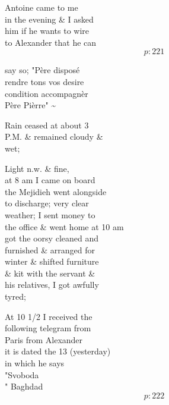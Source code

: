 \documentclass{report}
\begin{document}
	\par{
 	Antoine came to me\ \\in the evening \& I asked\ \\him if he wants to wire\ \\to Alexander that he can\ \\
  \[p: 221 \]

	}


	\par{
 	say so; "Père disposé\ \\rendre tons vos desire\ \\condition accompagnèr\ \\Père Pièrre" \~{}\ \\
	}

	\par{
 	Rain ceased at about 3\ \\P.M. \& remained cloudy \&\ \\wet;\ \\
	}

	\par{
 	Light n.w. \& fine,\ \\at 8 am I came on board\ \\the Mejidieh went alongside\ \\to discharge; very clear\ \\weather; I sent money to\ \\the office \& went home at 10 am\ \\got the oorsy cleaned and\ \\furnished \& arranged for\ \\winter \& shifted furniture\ \\\& kit with the servant \&\ \\his relatives, I got awfully\ \\tyred;\ \\
	}

	\par{
 	At 10 1/2 I received the\ \\following telegram from\ \\Paris from Alexander\ \\it is dated the 13 (yesterday)\ \\in which he says\ \\"Svoboda\ \\" Baghdad\ \\
  \[p: 222 \]

	}
\end{document}
